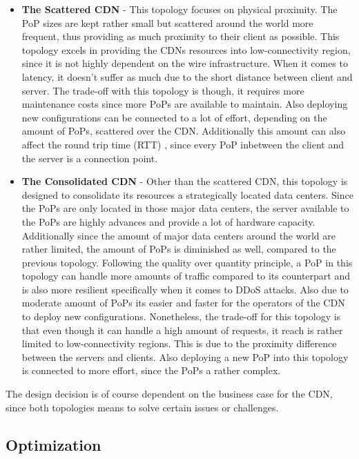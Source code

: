 \begin{itemize}
	\item \textbf{The Scattered CDN} - This topology focuses on physical proximity. The PoP sizes are kept rather small but scattered around the world more frequent, thus providing as much proximity to their client as possible. This topology excels in providing the CDNs resources into low-connectivity region, since it is not highly dependent on the wire infrastructure. When it comes to latency, it doesn't suffer as much due to the short distance between client and server. The trade-off with this topology is though, it requires more maintenance costs since more PoPs are available to maintain. Also deploying new configurations can be connected to a lot of effort, depending on the amount of PoPs, scattered over the CDN. 
	Additionally this amount can also affect the round trip time (RTT) , since every PoP inbetween the client and the server is a connection point.
	
	\item \textbf{The Consolidated CDN} - Other than the scattered CDN, this topology is designed to consolidate its resources a strategically located data centers. Since the PoPs are only located in those major data centers, the server available to the PoPs are highly advances and provide a lot of hardware capacity. Additionally since the amount of major data centers around the world are rather limited, the amount of PoPs is diminished as well, compared to the previous topology. Following the quality over quantity principle, a PoP in this topology can handle more amounts of traffic compared to its counterpart and is also more resilient specifically when it comes to DDoS attacks. Also due to moderate amount of PoPs its easier and faster for the operators of the CDN to deploy new configurations.
	Nonetheless, the trade-off for this topology is that even though it can handle a high amount of requests, it reach is rather limited to low-connectivity regions. This is due to the proximity difference between the servers and clients. Also deploying a new PoP into this topology is connected to more effort, since the PoPs a rather complex.	
\end{itemize}

The design decision is of course dependent on the business case for the CDN, since both topologies means to solve certain issues or challenges. \cite{cdn_architecture} 

\subsection{Optimization}

